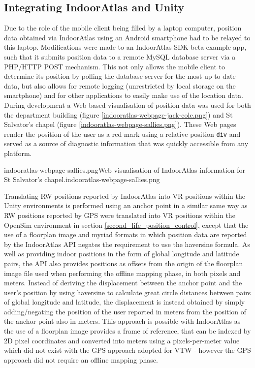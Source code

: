 
\subsection{Integrating IndoorAtlas and Unity}

Due to the role of the mobile client being filled by a laptop computer, position data obtained via IndoorAtlas using an Android smartphone had to be relayed to this laptop. Modifications were made to an IndoorAtlas SDK beta example app, such that it submits position data to a remote MySQL database server via a PHP/HTTP POST mechanism. This not only allows the mobile client to determine its position by polling the database server for the most up-to-date data, but also allows for remote logging (unrestricted by local storage on the smartphone) and for other applications to easily make use of the location data. During development a Web based visualisation of position data was used for both the department building (figure \ref{indooratlas-webpage-jack-cole.png}) and St Salvator's chapel (figure \ref{indooratlas-webpage-sallies.png}). These Web pages render the position of the user as a red mark using a relative position \texttt{div} and served as a source of diagnostic information that was quickly accessible from any platform.

        {indooratlas-webpage-sallies.png}{Web visualisation of IndoorAtlas information for St Salvator's chapel.}{indooratlas-webpage-sallies.png}

Translating RW positions reported by IndoorAtlas into VR positions within the Unity environments is performed using an anchor point in a similar same way as RW positions reported by GPS were translated into VR positions within the OpenSim environment in section \ref{second_life_position_control}, except that the use of a floorplan image and myriad formats in which position data are reported by the IndoorAtlas API negates the requirement to use the haversine formula. As well as providing indoor positions in the form of global longitude and latitude pairs, the API also provides positions as offsets from the origin of the floorplan image file used when performing the offline mapping phase, in both pixels and meters. Instead of deriving the displacement between the anchor point and the user's position by using haversine to calculate great circle distances between pairs of global longitude and latitude, the displacement is instead obtained by simply adding/negating the position of the user reported in meters from the position of the anchor point also in meters. This approach is possible with IndoorAtlas as the use of a floorplan image provides a frame of reference, that can be indexed by 2D pixel coordinates and converted into meters using a pixels-per-meter value which did not exist with the GPS approach adopted for VTW - however the GPS approach did not require an offline mapping phase.


